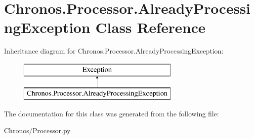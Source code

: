 \hypertarget{classChronos_1_1Processor_1_1AlreadyProcessingException}{}\section{Chronos.\+Processor.\+Already\+Processing\+Exception Class Reference}
\label{classChronos_1_1Processor_1_1AlreadyProcessingException}
Inheritance diagram for Chronos.\+Processor.\+Already\+Processing\+Exception\+:\begin{figure}[H]
\begin{center}
\leavevmode
\includegraphics[height=2.000000cm]{classChronos_1_1Processor_1_1AlreadyProcessingException}
\end{center}
\end{figure}


The documentation for this class was generated from the following file\+:\begin{DoxyCompactItemize}
\item 
Chronos/Processor.\+py\end{DoxyCompactItemize}

